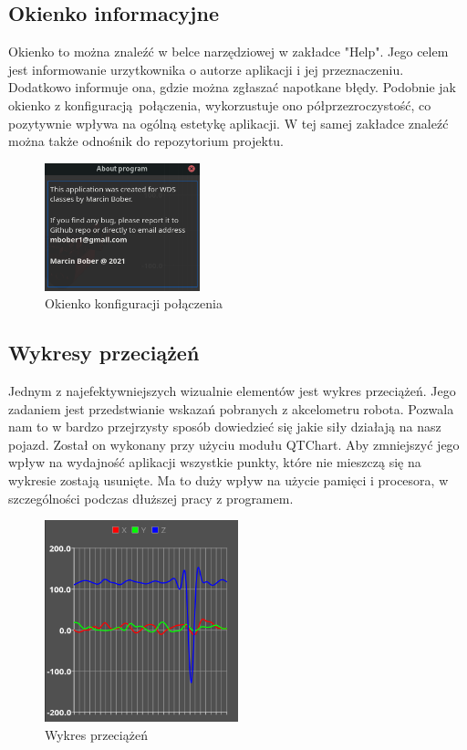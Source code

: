\documentclass[12pt,a4paper,polish]{article}
\begin{document}
  \subsection{Okienko informacyjne}
  Okienko to można znaleźć w belce narzędziowej w zakładce "Help". 
  Jego celem jest informowanie urzytkownika o autorze aplikacji i
  jej przeznaczeniu. Dodatkowo informuje ona, gdzie można zgłaszać
  napotkane błędy. Podobnie jak okienko z konfiguracją połączenia, 
  wykorzustuje ono półprzezroczystość, co pozytywnie wpływa na ogólną
  estetykę aplikacji. W tej samej zakładce znaleźć można także odnośnik
  do repozytorium projektu.

  \begin{figure}[h]
    \centering
    \includegraphics[width=0.4\textwidth]{img/final/info.png}
    \caption{Okienko konfiguracji połączenia}
    \label{fig:info}
  \end{figure}


  \subsection{Wykresy przeciążeń}
  Jednym z najefektywniejszych wizualnie elementów jest wykres przeciążeń.
  Jego zadaniem jest przedstwianie wskazań pobranych z akcelometru robota.
  Pozwala nam to w bardzo przejrzysty sposób dowiedzieć się jakie siły
  działają na nasz pojazd. Został on wykonany przy użyciu modułu QTChart.
  Aby zmniejszyć jego wpływ na wydajność aplikacji wszystkie punkty, które
  nie mieszczą się na wykresie zostają usunięte. Ma to duży wpływ na użycie
  pamięci i procesora, w szczególności podczas dłuższej pracy z programem.

  \begin{figure}[h]
    \centering
    \includegraphics[width=0.5\textwidth]{img/final/chart.png}
    \caption{Wykres przeciążeń}
    \label{fig:chart}
  \end{figure}
\end{document}

